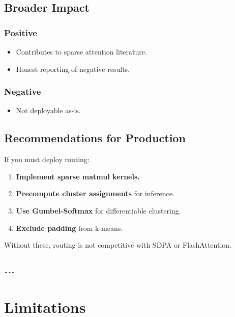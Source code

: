 \subsection{Broader Impact}

\subsubsection{Positive}

\begin{itemize}
\item Contributes to sparse attention literature.
\item Honest reporting of negative results.

\end{itemize}
\subsubsection{Negative}

\begin{itemize}
\item Not deployable as-is.

\end{itemize}
\subsection{Recommendations for Production}

If you must deploy routing:

\begin{enumerate}
\item \textbf{Implement sparse matmul kernels.}
\item \textbf{Precompute cluster assignments} for inference.
\item \textbf{Use Gumbel-Softmax} for differentiable clustering.
\item \textbf{Exclude padding} from k-means.

\end{enumerate}
Without these, routing is not competitive with SDPA or FlashAttention.
\begin{lstlisting}

---
\end{lstlisting}


\section{Limitations}

